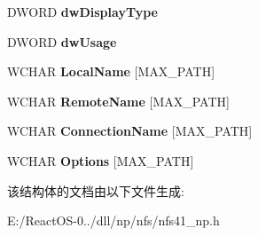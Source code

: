 \begin{DoxyCompactItemize}
D\+W\+O\+RD {\bfseries dw\+Display\+Type}
\item 
\mbox{\label{struct_____n_f_s41_n_p___n_e_t_r_e_s_o_u_r_c_e_ad67e3f026d65393796439506e476dcf7}} 
D\+W\+O\+RD {\bfseries dw\+Usage}
\item 
\mbox{\label{struct_____n_f_s41_n_p___n_e_t_r_e_s_o_u_r_c_e_a2c7398e8d13559cf0ab2870dd3e791f5}} 
W\+C\+H\+AR {\bfseries Local\+Name} \mbox{[}M\+A\+X\+\_\+\+P\+A\+TH\mbox{]}
\item 
\mbox{\label{struct_____n_f_s41_n_p___n_e_t_r_e_s_o_u_r_c_e_a6c7d2597faa1db8c3beedd0d75c96e7e}} 
W\+C\+H\+AR {\bfseries Remote\+Name} \mbox{[}M\+A\+X\+\_\+\+P\+A\+TH\mbox{]}
\item 
\mbox{\label{struct_____n_f_s41_n_p___n_e_t_r_e_s_o_u_r_c_e_af3673f9794c4f7736cd73d108c0a445a}} 
W\+C\+H\+AR {\bfseries Connection\+Name} \mbox{[}M\+A\+X\+\_\+\+P\+A\+TH\mbox{]}
\item 
\mbox{\label{struct_____n_f_s41_n_p___n_e_t_r_e_s_o_u_r_c_e_a1b0ade11a7ab78486cd74030416145da}} 
W\+C\+H\+AR {\bfseries Options} \mbox{[}M\+A\+X\+\_\+\+P\+A\+TH\mbox{]}
\end{DoxyCompactItemize}


该结构体的文档由以下文件生成\+:\begin{DoxyCompactItemize}
\item 
E\+:/\+React\+O\+S-\/0../dll/np/nfs/nfs41\+\_\+np.\+h\end{DoxyCompactItemize}
